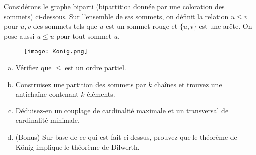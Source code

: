 \documentclass[11pt, a4paper]{article}
\begin{document}
\newpage
\begin{exo}
Consid\'erons le graphe biparti (bipartition donn\'ee par une coloration des sommets) ci-dessous. Sur l'ensemble de ses sommets, on d\'efinit la relation $u\leq v$ pour $u,v$ des sommets tels que $u$ est un sommet rouge et $\{u,v\}$ est une ar\^ete. On pose aussi $u\leq u$ pour tout sommet $u$. \\
\begin{figure}[!h]
\begin{center}
\texttt{[image: Konig.png]} 
\end{center}
\end{figure}
\begin{enumerate}[(a)]
\item V\'erifiez que $\leq$ est un ordre partiel.
\item Construisez une partition des sommets par $k$ cha\^ines et trouvez une anticha\^ine contenant $k$ \'el\'ements.
\item D\'eduisez-en un couplage de cardinalit\'e maximale et un transversal de cardinalit\'e minimale. 
\item (Bonus) Sur base de ce qui est fait ci-dessus, prouvez que le th\'eor\`eme de K\"onig implique le th\'eor\`eme de Dilworth.
\end{enumerate}
\end{exo}
\end{document}
